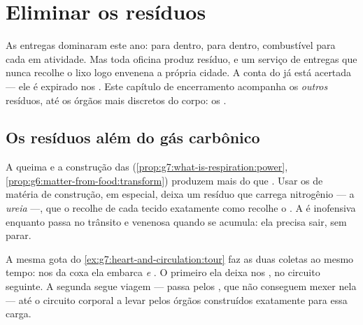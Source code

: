 \chapter{Eliminar os resíduos}\label{ch:g7:removing-wastes}

As entregas dominaram este ano:  para dentro,  para
dentro, combustível para cada  em atividade. Mas toda oficina
produz resíduo, e um serviço de entregas que nunca recolhe o lixo logo
envenena a própria cidade. A conta do  já está acertada
--- ele é expirado nos . Este capítulo de encerramento
acompanha os \emph{outros} resíduos, até os órgãos mais discretos do
corpo: os .

\section{Os resíduos além do gás carbônico}

\begin{proposition}\label{prop:g7:removing-wastes:rubbish}
A queima e a construção das 
(\cref{prop:g7:what-is-respiration:power},
\cref{prop:g6:matter-from-food:transform}) produzem mais do que . Usar os  de matéria de construção, em especial,
deixa um resíduo que carrega nitrogênio --- a \emph{ureia}
---, que o  recolhe de cada tecido exatamente como recolhe o . A  é inofensiva enquanto passa no trânsito e venenosa
quando se acumula: ela precisa sair, sem parar.
\end{proposition}
\admitted

\begin{example}\label{ex:g7:removing-wastes:rounds}
A mesma gota do \cref{ex:g7:heart-and-circulation:tour} faz as duas
coletas ao mesmo tempo: nos  da coxa ela embarca  \emph{e} . O primeiro ela deixa nos , no
circuito seguinte. A segunda segue viagem --- passa pelos , que
não conseguem mexer nela --- até o circuito corporal a levar pelos
órgãos construídos exatamente para essa carga.
\end{example}

